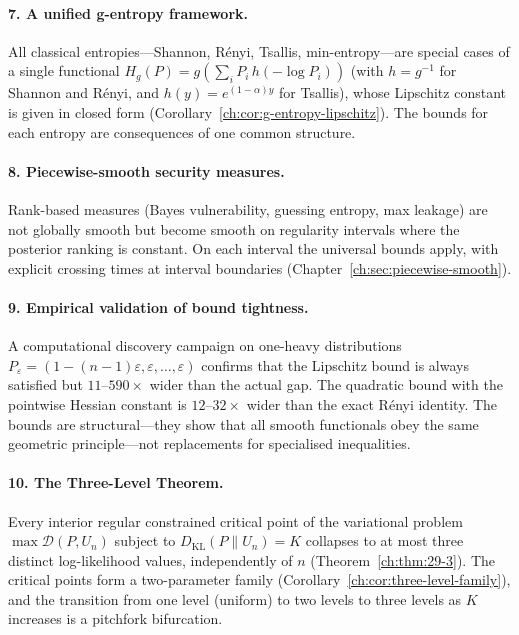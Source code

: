 \paragraph{7. A unified g-entropy framework.}
All classical entropies---Shannon, R\'enyi, Tsallis,
min-entropy---are special cases of a single functional
$H_g(P)=g(\sum_i P_i\,h(-\log P_i))$ (with $h=g^{-1}$ for Shannon and
R\'enyi, and $h(y)=e^{(1-\alpha)y}$ for Tsallis), whose Lipschitz constant is
given in closed form (Corollary~\ref{ch:cor:g-entropy-lipschitz}).  The bounds for each entropy are
consequences of one common structure.

\paragraph{8. Piecewise-smooth security measures.}
Rank-based measures (Bayes vulnerability, guessing entropy, max
leakage) are not globally smooth but become smooth on regularity
intervals where the posterior ranking is constant.  On each interval
the universal bounds apply, with explicit crossing times at interval
boundaries (Chapter~\ref{ch:sec:piecewise-smooth}).

\paragraph{9. Empirical validation of bound tightness.}
A computational discovery campaign on one-heavy distributions
$P_\varepsilon=(1-(n-1)\varepsilon,\varepsilon,\dots,\varepsilon)$
confirms that the Lipschitz bound is always satisfied but
$11$--$590\times$ wider than the actual gap.  The quadratic bound
with the pointwise Hessian constant is $12$--$32\times$ wider than the
exact R\'enyi identity.  The bounds
are structural---they show that all smooth functionals obey the same
geometric principle---not replacements for specialised inequalities.

\paragraph{10. The Three-Level Theorem.}
Every interior regular constrained critical point of the variational
problem $\max\mathcal D(P,U_n)$ subject to
$D_{\mathrm{KL}}(P\|U_n)=K$ collapses to at most three distinct
log-likelihood values, independently of $n$ (Theorem~\ref{ch:thm:29-3}).  The
critical points form a two-parameter family
(Corollary~\ref{ch:cor:three-level-family}), and the transition from
one level (uniform) to two levels to three levels as $K$ increases is
a pitchfork bifurcation.

